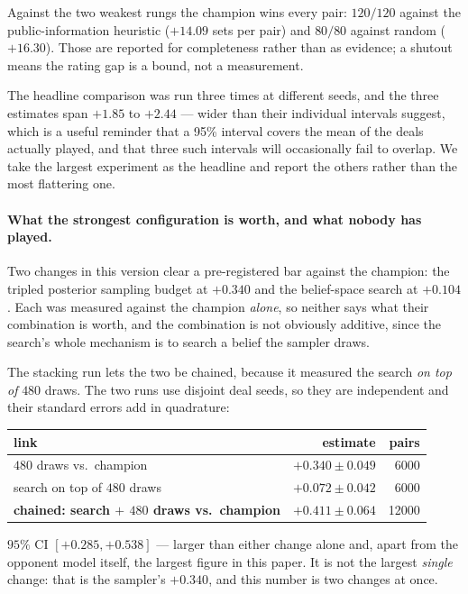 \documentclass[11pt,letterpaper]{article}
\begin{document}
Against the two weakest rungs the champion wins every pair: $120/120$ against
the public-information heuristic ($+14.09$ sets per pair) and $80/80$ against
random ($+16.30$). Those are reported for completeness rather than as evidence;
a shutout means the rating gap is a bound, not a measurement.

The headline comparison was run three times at different seeds, and the three
estimates span $+1.85$ to $+2.44$ --- wider than their individual intervals
suggest, which is a useful reminder that a 95\% interval covers the mean of the
deals actually played, and that three such intervals will occasionally fail to
overlap. We take the largest experiment as the headline and report the others
rather than the most flattering one.

\paragraph{What the strongest configuration is worth, and what nobody has
played.} Two changes in this version clear a pre-registered bar against the
champion: the tripled posterior sampling budget at $+0.340$ and the
belief-space search at $+0.104$. Each was measured against the champion
\emph{alone}, so neither says what their combination is worth, and the
combination is not obviously additive, since the search's whole mechanism is to
search a belief the sampler draws.

The stacking run lets the two be chained, because it measured the search
\emph{on top of} $480$ draws. The two runs use disjoint deal seeds, so they are
independent and their standard errors add in quadrature:
\begin{center}
\begin{tabular}{lrr}
\toprule
link & estimate & pairs \\
\midrule
$480$ draws vs.\ champion & $+0.340 \pm 0.049$ & 6000 \\
search on top of $480$ draws & $+0.072 \pm 0.042$ & 6000 \\
\midrule
\textbf{chained: search $+$ $480$ draws vs.\ champion}
  & $\mathbf{+0.411 \pm 0.064}$ & 12000 \\
\bottomrule
\end{tabular}
\end{center}
$95\%$ CI $[+0.285, +0.538]$ --- larger than either change alone and, apart
from the opponent model itself, the largest figure in this paper. It is not the
largest \emph{single} change: that is the sampler's $+0.340$, and this number is
two changes at once.
\end{document}
